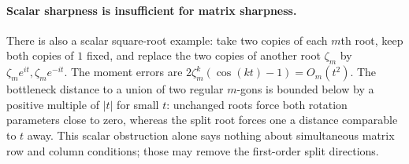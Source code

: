 \paragraph{Scalar sharpness is insufficient for matrix sharpness.}
There is also a scalar square-root example: take two copies of each $m$th root, keep both copies of $1$ fixed, and replace the two copies of another root $\zeta_m$ by $\zeta_me^{it},\zeta_me^{-it}$. The moment errors are $2\zeta_m^k(\cos(kt)-1)=O_m(t^2)$. The bottleneck distance to a union of two regular $m$-gons is bounded below by a positive multiple of $|t|$ for small $t$: unchanged roots force both rotation parameters close to zero, whereas the split root forces one a distance comparable to $t$ away. This scalar obstruction alone says nothing about simultaneous matrix row and column conditions; those may remove the first-order split directions.
